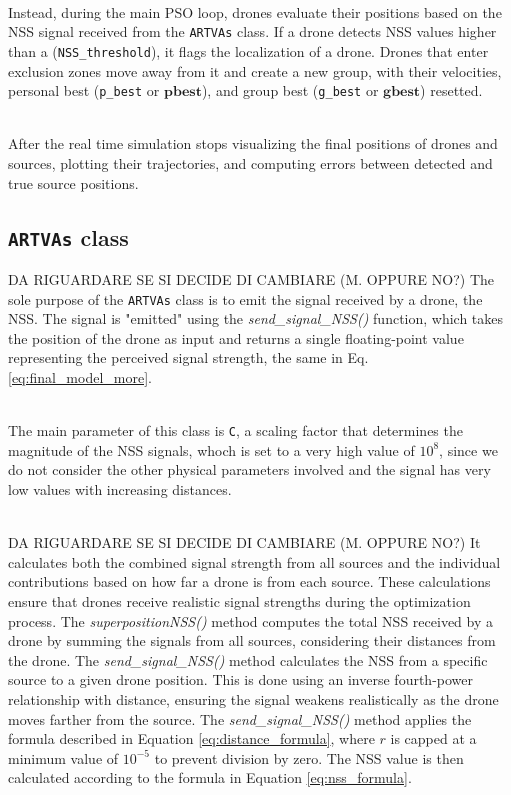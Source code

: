\noindent\\
Instead, during the main PSO loop, drones evaluate 
their positions based on the NSS signal received from the \texttt{ARTVAs} class. 
If a drone detects NSS values higher than a (\texttt{NSS\_threshold}),
it flags the localization of a drone.
Drones that enter exclusion zones move away from it and 
create a new group, with their velocities, 
personal best (\texttt{p\_best} or $\mathbf{pbest}$), and group best 
(\texttt{g\_best} or $\mathbf{gbest}$) resetted.

\noindent\\
After the real time simulation stops visualizing the final 
positions of drones and sources, plotting their trajectories, 
and computing errors between detected and true source positions.

\subsection{\texttt{ARTVAs} class}
DA RIGUARDARE SE SI DECIDE DI CAMBIARE (M. OPPURE NO?)
The sole purpose of the \texttt{ARTVAs} class is to 
emit the signal received by a drone, the NSS. 
The signal is "emitted" using the \textit{send\_signal\_NSS()} 
function, which takes the position of the drone as 
input and returns a single floating-point value representing 
the perceived signal strength, the same in Eq.\ref{eq:final_model_more}.

\noindent\\
The main parameter of this class is \texttt{C}, a 
scaling factor that determines the magnitude of the NSS signals, 
whoch is set to a very high value of $10^8$, since we do not consider
the other physical parameters involved and the signal has very low values
with increasing distances.

\noindent\\
DA RIGUARDARE SE SI DECIDE DI CAMBIARE (M. OPPURE NO?)
It calculates both the combined signal strength 
from all sources and the individual contributions based 
on how far a drone is from each source. 
These calculations ensure that drones receive 
realistic signal strengths during the optimization process.
The \textit{superpositionNSS()} method computes the total 
NSS received by a drone by summing the signals from all sources, 
considering their distances from the drone. 
The \textit{send\_signal\_NSS()} method calculates the NSS from a
specific source to a given drone position. 
This is done using an inverse fourth-power relationship with distance, 
ensuring the signal weakens realistically 
as the drone moves farther from the source.
The \textit{send\_signal\_NSS()} method applies the formula 
described in Equation \ref{eq:distance_formula}, 
where \texttt{\(r\)} is capped at a minimum value of $10^{-5}$ 
to prevent division by zero. The NSS value is then calculated according 
to the formula in Equation \ref{eq:nss_formula}.

